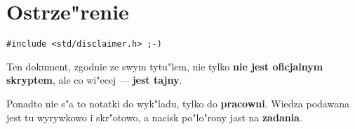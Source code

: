 \chapter*{Ostrze"renie}

\begin{verbatim}
#include <std/disclaimer.h> ;-)
\end{verbatim}

Ten dokument, zgodnie ze swym tytu"lem, nie tylko {\bf nie jest
oficjalnym skryptem}, ale co wi"ecej --- {\bf jest tajny}. 

Ponadto nie s"a to notatki do wyk"ladu, tylko do {\bf
pracowni}. Wiedza podawana jest tu wyrywkowo i skr"otowo,
a nacisk po"lo"rony jast na {\bf zadania}.
%

\bigskip
{}
